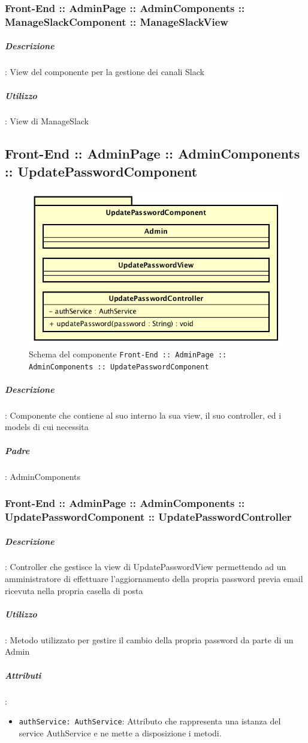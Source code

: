\documentclass[../ManualeSviluppatore_v2.0.0.tex]{subfiles}
\begin{document}
		      	\subsubsection{Front-End :: AdminPage :: AdminComponents :: ManageSlackComponent :: ManageSlackView}
					\subparagraph{Descrizione}: View del componente per la gestione dei canali Slack
					\subparagraph{Utilizzo}: View di ManageSlack

	\newpage
	\subsection{Front-End :: AdminPage :: AdminComponents :: UpdatePasswordComponent}
	\begin{figure}[!h]
		\centering
		\includegraphics[scale=0.6]{Architettura/Front-End/AdminPage/AdminComponents/UpdatePasswordComponent.png}
		\caption{Schema del componente \texttt{Front-End :: AdminPage :: AdminComponents :: UpdatePasswordComponent}}
	\end{figure}

			\subparagraph{Descrizione}: Componente che contiene al suo interno la sua view, il suo controller, ed i models di cui necessita
			\subparagraph{Padre}: AdminComponents
				\subsubsection{Front-End :: AdminPage :: AdminComponents :: UpdatePasswordComponent :: UpdatePasswordController}
					\subparagraph{Descrizione}: Controller che gestisce la view di UpdatePasswordView permettendo ad un amministratore di effettuare l'aggiornamento della propria password previa email ricevuta nella propria casella di posta
					\subparagraph{Utilizzo}: Metodo utilizzato per gestire il cambio della propria password da parte di un Admin
					\subparagraph{Attributi}:
					\begin{itemize}
						\item \texttt{authService: AuthService}: Attributo che rappresenta una istanza del service AuthService e ne mette a disposizione i metodi.
					\end{itemize}
\end{document}
